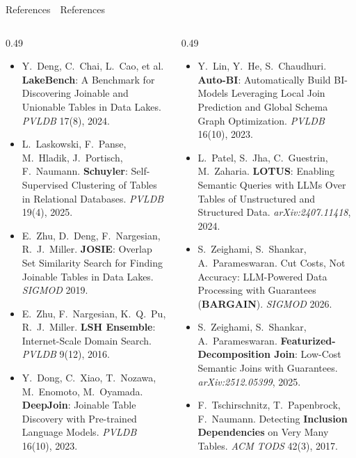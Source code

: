 \documentclass[aspectratio=169]{beamer}
\newcommand{\apptitle}[3]{\textcolor{#1}{#2}~\textcolor{black!30}{\textbar}~#3}
\begin{document}
\newcommand{\refitem}[2]{\item[\textcolor{gray}{[#1]}] #2}
\begin{frame}{\apptitle{black!60}{References}{References}}
\tiny
\vspace{2mm}
\begin{columns}[T]
\begin{column}{0.49\textwidth}
\begin{itemize}\setlength\itemsep{5pt}\setlength{}
  \refitem{1}{Y.~Deng, C.~Chai, L.~Cao, et al. \textbf{LakeBench}: A Benchmark for Discovering Joinable and Unionable Tables in Data Lakes. \emph{PVLDB} 17(8), 2024.}
  \refitem{2}{L.~Laskowski, F.~Panse, M.~Hladik, J.~Portisch, F.~Naumann. \textbf{Schuyler}: Self-Supervised Clustering of Tables in Relational Databases. \emph{PVLDB} 19(4), 2025.}
  \refitem{3}{E.~Zhu, D.~Deng, F.~Nargesian, R.~J.~Miller. \textbf{JOSIE}: Overlap Set Similarity Search for Finding Joinable Tables in Data Lakes. \emph{SIGMOD} 2019.}
  \refitem{4}{E.~Zhu, F.~Nargesian, K.~Q.~Pu, R.~J.~Miller. \textbf{LSH Ensemble}: Internet-Scale Domain Search. \emph{PVLDB} 9(12), 2016.}
  \refitem{5}{Y.~Dong, C.~Xiao, T.~Nozawa, M.~Enomoto, M.~Oyamada. \textbf{DeepJoin}: Joinable Table Discovery with Pre-trained Language Models. \emph{PVLDB} 16(10), 2023.}
\end{itemize}
\end{column}
\begin{column}{0.49\textwidth}
\begin{itemize}\setlength\itemsep{5pt}\setlength{}
  \refitem{6}{Y.~Lin, Y.~He, S.~Chaudhuri. \textbf{Auto-BI}: Automatically Build BI-Models Leveraging Local Join Prediction and Global Schema Graph Optimization. \emph{PVLDB} 16(10), 2023.}
  \refitem{7}{L.~Patel, S.~Jha, C.~Guestrin, M.~Zaharia. \textbf{LOTUS}: Enabling Semantic Queries with LLMs Over Tables of Unstructured and Structured Data. \emph{arXiv:2407.11418}, 2024.}
  \refitem{8}{S.~Zeighami, S.~Shankar, A.~Parameswaran. Cut Costs, Not Accuracy: LLM-Powered Data Processing with Guarantees (\textbf{BARGAIN}). \emph{SIGMOD} 2026.}
  \refitem{9}{S.~Zeighami, S.~Shankar, A.~Parameswaran. \textbf{Featurized-Decomposition Join}: Low-Cost Semantic Joins with Guarantees. \emph{arXiv:2512.05399}, 2025.}
  \refitem{10}{F.~Tschirschnitz, T.~Papenbrock, F.~Naumann. Detecting \textbf{Inclusion Dependencies} on Very Many Tables. \emph{ACM TODS} 42(3), 2017.}
\end{itemize}
\end{column}
\end{columns}
\end{frame}
\end{document}
